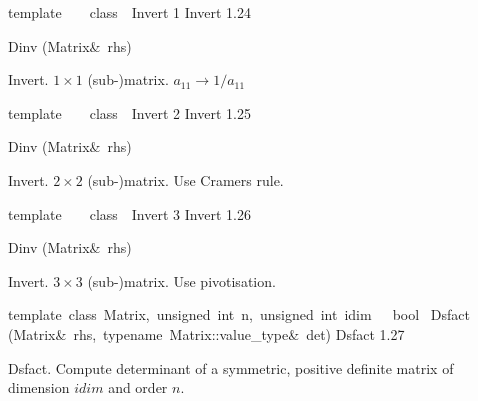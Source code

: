 \documentclass{article}
\begin{document}
\begin{cxxentry}
\begin{cxxclass}
\begin{cxxdoc}
\end{cxxdoc}
\end{cxxclass}
\begin{cxxclass}
{template\ \<\>\ \ \ class\ \ Invert}
        {1}
        {}
        {Invert\>}
        {1.24}
\begin{cxxpublic}
        {Dinv}
        {(Matrix\&\ rhs)}
        {}
        {}
\label{cxx.1.24.1}
\end{cxxpublic}
\begin{cxxdoc}
Invert\>.
$1\times1$ (sub-)matrix. $a_{11} \to 1/a_{11}$


\end{cxxdoc}
\end{cxxclass}
\begin{cxxclass}
{template\ \<\>\ \ \ class\ \ Invert}
        {2}
        {}
        {Invert\>}
        {1.25}
\begin{cxxpublic}
        {Dinv}
        {(Matrix\&\ rhs)}
        {}
        {}
\label{cxx.1.25.1}
\end{cxxpublic}
\begin{cxxdoc}
Invert\>.
$2\times2$ (sub-)matrix. Use Cramers rule.


\end{cxxdoc}
\end{cxxclass}
\begin{cxxclass}
{template\ \<\>\ \ \ class\ \ Invert}
        {3}
        {}
        {Invert\>}
        {1.26}
\begin{cxxpublic}
        {Dinv}
        {(Matrix\&\ rhs)}
        {}
        {}
\label{cxx.1.26.1}
\end{cxxpublic}
\begin{cxxdoc}
Invert\>.
$3\times3$ (sub-)matrix. Use pivotisation.


\end{cxxdoc}
\end{cxxclass}
\begin{cxxfunction}
{template\ \<class\ Matrix,\ unsigned\ int\ n,\ unsigned\ int\ idim\>\ \ \ bool\ }
        {Dsfact}
        {(Matrix\&\ rhs,\ typename\ Matrix::value\_type\&\ det)}
        {Dsfact}
        {1.27}
\begin{cxxdoc}
Dsfact.
Compute determinant of a symmetric, positive definite matrix of dimension
$idim$ and order $n$.



\end{cxxdoc}
\end{cxxfunction}
\end{cxxentry}
\end{document}
